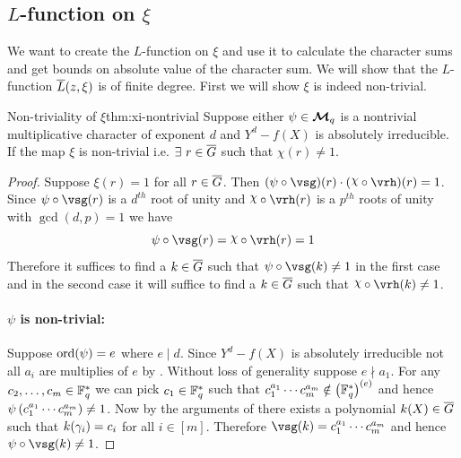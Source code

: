 \subsection{\texorpdfstring{$L$}{L}-function on \texorpdfstring{$\xi$}{ξ}}
We want to create the $L$-function on $\xi$ and use it to calculate the character sums and get bounds on absolute value of the character sum. We will show that the $L$-function $\overline{L}(z,\xi)$ is of finite degree. First we will show $\xi$ is indeed non-trivial. 
\begin{Theorem}{Non-triviality of $\xi$}{thm:xi-nontrivial}
  Suppose either $\psi\in\boldsymbol{\mathcal{M}}_q$ is a nontrivial multiplicative character of exponent $d$ and $Y^d-f(X)$ is absolutely irreducible. If the map $\xi$ is non-trivial i.e. $\exists\ r\in \overline{G}$ such that $\chi(r)\neq 1$. 
\end{Theorem}
\begin{proof}
  Suppose $\xi(r)=1$ for all $r\in\overline{G}$. Then $(\psi\circ\vsg)(r)\cdot (\chi\circ \vrh)(r)=1$. Since $\psi\circ\vsg(r)$ is a $d^{th}$ root of unity and $\chi\circ \vrh(r)$ is a $p^{th}$ roots of unity with $\gcd(d,p)=1$ we have $$\psi\circ\vsg(r)=\chi\circ\vrh(r)=1$$
  Therefore it suffices to find a $k\in \overline{G}$ such that $\psi\circ\vsg(k)\neq 1$ in the first case and in the second case it will suffice to find a $k\in\overline{G}$ such that $\chi\circ\vrh(k)\neq 1$. 

  \paragraph*{$\psi$ is non-trivial:} Suppose $\operatorname{ord}(\psi)=e$ where $e\mid d$. Since $Y^d-f(X)$ is absolutely irreducible not all $a_i$ are multiplies of $e$ by . Without loss of generality suppose $e\nmid a_1$. For any $c_2,\dots, c_m\in\mathbb{F}_q^*$ we can pick $c_1\in\mathbb{F}_q^*$ such that $c_1^{a_1}\cdots c_m^{a_m}\notin \left(\mathbb{F}_q^*\right)^{(e)}$ and hence $\psi\left(c_1^{a_1}\cdots c_m^{a_m}\right)\neq 1$. Now by the arguments of  there exists a polynomial $k(X)\in\overline{G}$ such that $k(\gamma_i)=c_i$ for all $i\in[m]$. Therefore $\vsg(k)=c_1^{a_1}\cdots c_m^{a_m}$ and hence $\psi\circ \vsg(k)\neq 1$.

\end{proof}
